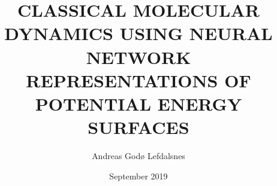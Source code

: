 \documentclass[twoside,english]{uiofysmaster}
\author{Andreas God{\o} Lefdalsnes}
\title{\uppercase{Classical molecular dynamics using neural network
representations of potential energy surfaces}}
\date{September 2019}
\begin{document}
\begin{titlepage}
\maketitle
\end{titlepage}
\end{document}
